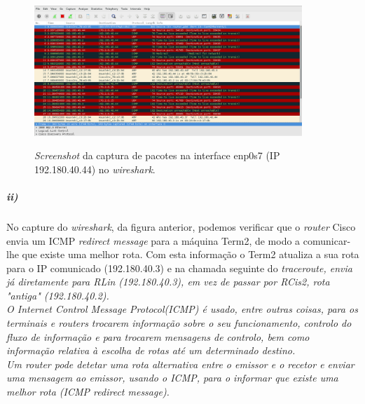 \begin{figure}[h]
\centering
\includegraphics[width=0.9\textwidth, height=0.35\textheight]{1_g1_screenshot.png}
\label{fig:wireshark-enp0s7}
\caption{\emph{Screenshot} da captura de pacotes na interface enp0s7 (IP 192.180.40.44) no \emph{wireshark}.}
\end{figure}
\newpage
\subparagraph{ii)}
No capture do \emph{wireshark}, da figura anterior, podemos verificar que o \emph{router} Cisco envia um ICMP \emph{redirect message} para a máquina \textsf{Term2}, de modo a comunicar-lhe que existe uma melhor rota. Com esta informação o \textsf{Term2} atualiza a sua rota para o IP comunicado (192.180.40.3) e na chamada seguinte do \it{traceroute}, envia já diretamente para \textsf{RLin} (192.180.40.3), em vez de passar por \textsf{RCis2}, rota "antiga" (192.180.40.2).\\
O \emph{Internet Control Message Protocol}(ICMP) é usado, entre outras coisas, para os terminais e \emph{routers} trocarem informação sobre o seu funcionamento, controlo do fluxo de informação e para trocarem mensagens de controlo, bem como informação relativa à escolha de rotas até um determinado destino.\\
Um \emph{router} pode detetar uma rota alternativa entre o emissor e o recetor e enviar uma mensagem ao emissor, usando o ICMP, para o informar que existe uma melhor rota (ICMP \emph{redirect message}).